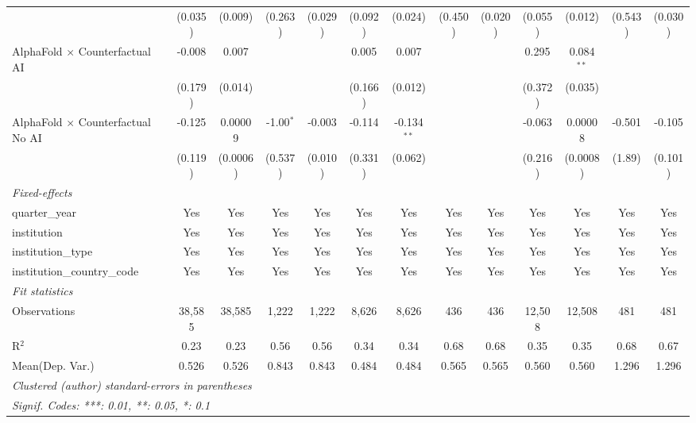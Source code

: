 \begin{tabular}{lcccccccccccc}
                                            & (0.035)       & (0.009)        & (0.263)     & (0.029) & (0.092)      & (0.024)       & (0.450) & (0.020)       & (0.055) & (0.012)      & (0.543)      & (0.030)\\   
   AlphaFold $\times$ Counterfactual AI     & -0.008        & 0.007          &             &         & 0.005        & 0.007         &         &               & 0.295   & 0.084$^{**}$ &              &   \\   
                                            & (0.179)       & (0.014)        &             &         & (0.166)      & (0.012)       &         &               & (0.372) & (0.035)      &              &   \\   
   AlphaFold $\times$ Counterfactual No AI  & -0.125        & 0.00009        & -1.00$^{*}$ & -0.003  & -0.114       & -0.134$^{**}$ &         &               & -0.063  & 0.00008      & -0.501       & -0.105\\   
                                            & (0.119)       & (0.0006)       & (0.537)     & (0.010) & (0.331)      & (0.062)       &         &               & (0.216) & (0.0008)     & (1.89)       & (0.101)\\   
   \midrule
   \emph{Fixed-effects}\\
   quarter\_year                            & Yes           & Yes            & Yes         & Yes     & Yes          & Yes           & Yes     & Yes           & Yes     & Yes          & Yes          & Yes\\  
   institution                              & Yes           & Yes            & Yes         & Yes     & Yes          & Yes           & Yes     & Yes           & Yes     & Yes          & Yes          & Yes\\  
   institution\_type                        & Yes           & Yes            & Yes         & Yes     & Yes          & Yes           & Yes     & Yes           & Yes     & Yes          & Yes          & Yes\\  
   institution\_country\_code               & Yes           & Yes            & Yes         & Yes     & Yes          & Yes           & Yes     & Yes           & Yes     & Yes          & Yes          & Yes\\  
   \midrule
   \emph{Fit statistics}\\
   Observations                             & 38,585        & 38,585         & 1,222       & 1,222   & 8,626        & 8,626         & 436     & 436           & 12,508  & 12,508       & 481          & 481\\  
   R$^2$                                    & 0.23          & 0.23           & 0.56        & 0.56    & 0.34         & 0.34          & 0.68    & 0.68          & 0.35    & 0.35         & 0.68         & 0.67\\  
Mean(Dep. Var.) & 0.526 & 0.526 & 0.843 & 0.843 & 0.484 & 0.484 & 0.565 & 0.565 & 0.560 & 0.560 & 1.296 & 1.296 \\
   \midrule \midrule
   \multicolumn{13}{l}{\emph{Clustered (author) standard-errors in parentheses}}\\
   \multicolumn{13}{l}{\emph{Signif. Codes: ***: 0.01, **: 0.05, *: 0.1}}\\
\end{tabular}
\par\endgroup
